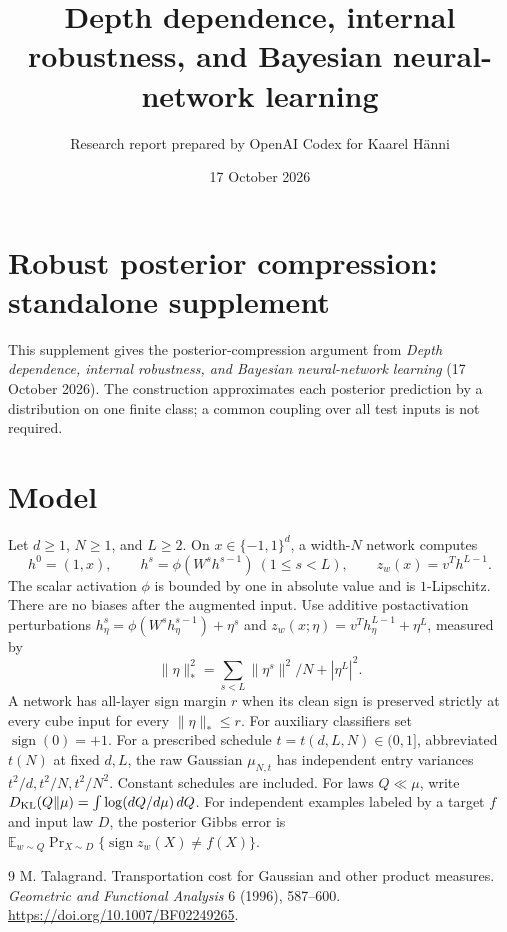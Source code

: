\documentclass[11pt]{article}
\title{Depth dependence, internal robustness, and Bayesian neural-network learning}
\author{Research report prepared by OpenAI Codex for Kaarel H\"anni}
\date{17 October 2026}
\begin{document}
\section*{Robust posterior compression: standalone supplement}
This supplement gives the posterior-compression argument from
\emph{Depth dependence, internal robustness, and Bayesian neural-network
learning} (17 October 2026). The construction approximates each
posterior prediction by a distribution on one finite class; a common
coupling over all test inputs is not required.
\section{Model}
Let $d\ge1$, $N\ge1$, and $L\ge2$. On $x\in\{-1,1\}^d$,
a width-$N$ network computes
\[
 h^0=(1,x),\qquad h^s=\phi(W^sh^{s-1})\ (1\le s<L),
 \qquad z_w(x)=v^Th^{L-1}.
\]
The scalar activation $\phi$ is bounded by one in absolute value and
is $1$-Lipschitz. There are no biases after the augmented input.
Use additive postactivation perturbations
$h^s_\eta=\phi(W^sh^{s-1}_\eta)+\eta^s$ and
$z_w(x;\eta)=v^Th^{L-1}_\eta+\eta^L$, measured by
\begin{equation}\label{eq:noisenorm}\|\eta\|_*^2=\sum_{s<L}\|\eta^s\|^2/N+|\eta^L|^2.\end{equation}
A network has all-layer sign margin $r$ when its clean sign is
preserved strictly at every cube input for every $\|\eta\|_*\le r$.
For auxiliary classifiers set $\operatorname{sign}(0)=+1$.
For a prescribed schedule $t=t(d,L,N)\in(0,1]$, abbreviated $t(N)$
at fixed $d,L$, the raw Gaussian $\mu_{N,t}$ has independent entry
variances $t^2/d,t^2/N,t^2/N^2$. Constant schedules are included.
For laws $Q\ll\mu$, write
$D_{\rm KL}(Q\Vert\mu)=\int\log(dQ/d\mu)\,dQ$.
For independent examples labeled by a target $f$ and input law $D$,
the posterior Gibbs error is
$\mathbb E_{w\sim Q}\Pr_{X\sim D}
\{\operatorname{sign}z_w(X)\ne f(X)\}$.

\begin{thebibliography}{9}
 M. Talagrand.
Transportation cost for Gaussian and other product measures.
\emph{Geometric and Functional Analysis} 6 (1996), 587--600.
\url{https://doi.org/10.1007/BF02249265}.
\end{thebibliography}
\end{document}
